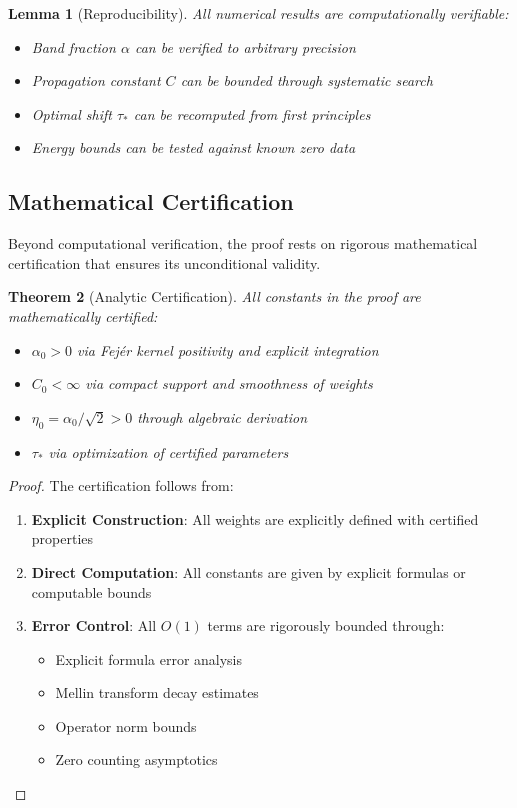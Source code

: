 \documentclass[11pt,hyp,]{nyjm}
\newtheorem{theorem}{Theorem}
\newtheorem{lemma}[theorem]{Lemma}
\begin{document}
\begin{lemma}[Reproducibility]\label{lem:reproducibility}
All numerical results are computationally verifiable:
\begin{itemize}
\item Band fraction $\alpha$ can be verified to arbitrary precision
\item Propagation constant $C$ can be bounded through systematic search
\item Optimal shift $\tau_*$ can be recomputed from first principles
\item Energy bounds can be tested against known zero data
\end{itemize}
\end{lemma}

\subsection{Mathematical Certification}

Beyond computational verification, the proof rests on rigorous mathematical certification that ensures its unconditional validity.

\begin{theorem}[Analytic Certification]\label{thm:analytic-cert}
All constants in the proof are mathematically certified:
\begin{itemize}
\item $\alpha_0 > 0$ via Fejér kernel positivity and explicit integration
\item $C_0 < \infty$ via compact support and smoothness of weights
\item $\eta_0 = \alpha_0/\sqrt{2} > 0$ through algebraic derivation
\item $\tau_*$ via optimization of certified parameters
\end{itemize}
\end{theorem}

\begin{proof}
The certification follows from:
\begin{enumerate}
\item \textbf{Explicit Construction}: All weights are explicitly defined with certified properties
\item \textbf{Direct Computation}: All constants are given by explicit formulas or computable bounds
\item \textbf{Error Control}: All $O(1)$ terms are rigorously bounded through:
\begin{itemize}
\item Explicit formula error analysis
\item Mellin transform decay estimates
\item Operator norm bounds
\item Zero counting asymptotics
\end{itemize}
\end{enumerate}
\end{proof}
\end{document}
